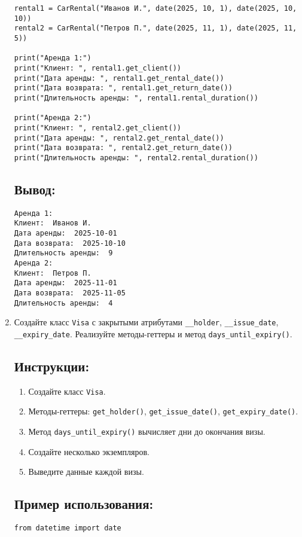 \begin{enumerate}
\begin{lstlisting}[caption=Пример кода]
rental1 = CarRental("Иванов И.", date(2025, 10, 1), date(2025, 10, 10))
rental2 = CarRental("Петров П.", date(2025, 11, 1), date(2025, 11, 5))

print("Аренда 1:")
print("Клиент: ", rental1.get_client())
print("Дата аренды: ", rental1.get_rental_date())
print("Дата возврата: ", rental1.get_return_date())
print("Длительность аренды: ", rental1.rental_duration())

print("Аренда 2:")
print("Клиент: ", rental2.get_client())
print("Дата аренды: ", rental2.get_rental_date())
print("Дата возврата: ", rental2.get_return_date())
print("Длительность аренды: ", rental2.rental_duration())
\end{lstlisting}

\subsection*{Вывод:}
\begin{lstlisting}[caption=Ожидаемый вывод]
Аренда 1:
Клиент:  Иванов И.
Дата аренды:  2025-10-01
Дата возврата:  2025-10-10
Длительность аренды:  9
Аренда 2:
Клиент:  Петров П.
Дата аренды:  2025-11-01
Дата возврата:  2025-11-05
Длительность аренды:  4
\end{lstlisting}

\item
Создайте класс \texttt{Visa} с закрытыми атрибутами \texttt{\_\_holder}, \texttt{\_\_issue\_date}, \texttt{\_\_expiry\_date}. Реализуйте методы-геттеры и метод \texttt{days\_until\_expiry()}.

\subsection*{Инструкции:}
\begin{enumerate}
    \item Создайте класс \texttt{Visa}.
    \item Методы-геттеры: \texttt{get\_holder()}, \texttt{get\_issue\_date()}, \texttt{get\_expiry\_date()}.
    \item Метод \texttt{days\_until\_expiry()} вычисляет дни до окончания визы.
    \item Создайте несколько экземпляров.
    \item Выведите данные каждой визы.
\end{enumerate}

\subsection*{Пример использования:}
\begin{lstlisting}[caption=Пример кода]
from datetime import date


\end{lstlisting}
\end{enumerate}
